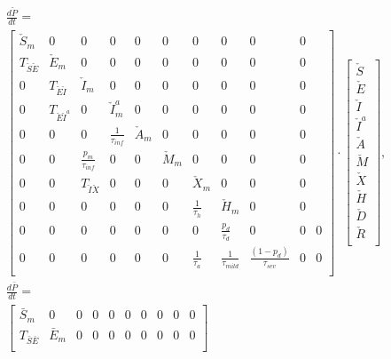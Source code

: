 \documentclass[notitlepage, superscriptaddress]{revtex4-2}
\begin{document}
\begin{eqnarray}
&\frac{d\check{P}}{dt} = \nonumber \\
&\begin{bmatrix}
\check{S}_{m} & 0 & 0 & 0 & 0 & 0 & 0 & 0 & 0 & 0 \\[.15cm] 
T_{\check{S}\check{E}}  & \check{E}_{m} & 0 & 0 & 0 & 0 & 0 & 0 & 0 & 0 \\[.15cm]
0 & T_{\check{E}\check{I}} & \check{I}_{m} & 0 & 0 & 0 & 0 & 0 & 0 & 0 \\[.15cm] 
0 & T_{\check{E}\check{I}^{a}} & 0  & \check{I}^{a}_{m}  & 0 & 0 & 0 & 0 & 0 & 0 \\[.15cm] 
0 & 0 & 0 & \frac{1}{\tau_{inf}}  & \check{A}_{m} & 0 & 0 & 0 & 0 & 0 \\[.15cm] 
0 & 0 & \frac{p_{m}}{\tau_{inf}} & 0 & 0  & \check{M}_{m}  & 0 & 0 & 0 & 0 \\[.15cm] 
0 & 0 & T_{\check{I}\check{X}} & 0 & 0 & 0  & \check{X}_{m}  & 0 & 0 & 0 \\[.15cm] 
0 & 0 & 0 & 0 & 0 & 0 & \frac{1}{\tau_{h}}  & \check{H}_{m}  & 0 & 0 \\[.15cm] 
0 & 0 & 0 & 0 & 0 & 0 & 0 & \frac{p_{d}}{\tau_{d}}  & 0 & 0 & 0 \\[.15cm]
0 & 0 & 0 & 0 & 0 & 0 & \frac{1}{\tau_{a}} & \frac{1}{\tau_{mild}}  & \frac{(1-p_{d})}{\tau_{sev}} & 0 & 0  \\[.15cm]
\end{bmatrix}
\cdot
\begin{bmatrix}
\check{S} \\[.15cm]
\check{E} \\[.15cm]
\check{I} \\[.15cm]
\check{I}^{a} \\[.15cm]
\check{A} \\[.15cm]
\check{M} \\[.15cm]
\check{X} \\[.15cm]
\check{H} \\[.15cm]
\check{D} \\[.15cm]
\check{R} \\[.15cm]
\end{bmatrix}, \\
%
&\frac{d\bar{P}}{dt} =  \\
&\begin{bmatrix}
\bar{S}_{m} & 0 & 0 & 0 & 0 & 0 & 0 & 0 & 0 & 0 \\[.15cm] 
T_{\bar{S}\bar{E}}  & \bar{E}_{m} & 0 & 0 & 0 & 0 & 0 & 0 & 0 & 0 \\[.15cm]

\end{bmatrix}
\end{eqnarray}
\end{document}
